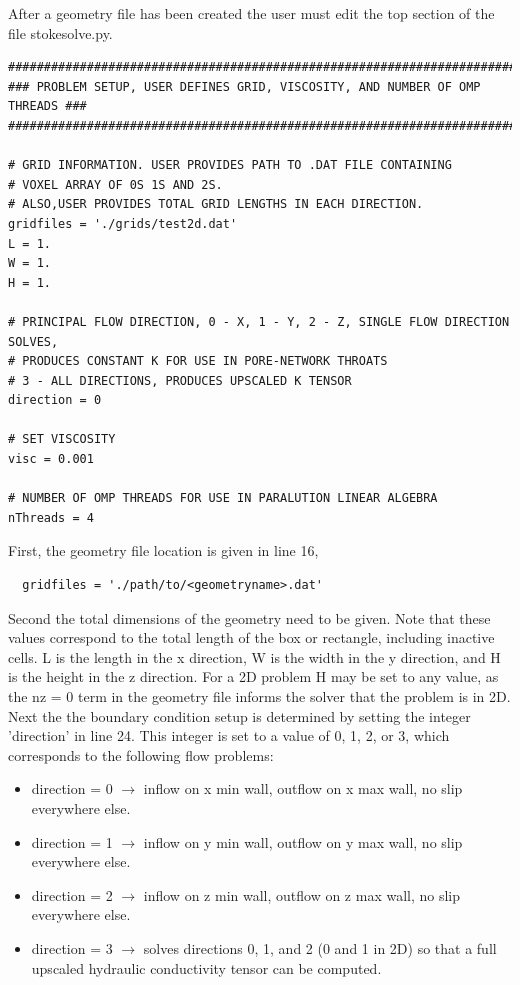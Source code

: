 \documentclass{report}
\begin{document}
After a geometry file has been created the user must
edit the top section of the file stokesolve.py.
\begin{lstlisting}
##############################################################################
### PROBLEM SETUP, USER DEFINES GRID, VISCOSITY, AND NUMBER OF OMP THREADS ###
##############################################################################

# GRID INFORMATION. USER PROVIDES PATH TO .DAT FILE CONTAINING
# VOXEL ARRAY OF 0S 1S AND 2S.
# ALSO,USER PROVIDES TOTAL GRID LENGTHS IN EACH DIRECTION.
gridfiles = './grids/test2d.dat'
L = 1.
W = 1.
H = 1.

# PRINCIPAL FLOW DIRECTION, 0 - X, 1 - Y, 2 - Z, SINGLE FLOW DIRECTION SOLVES,
# PRODUCES CONSTANT K FOR USE IN PORE-NETWORK THROATS
# 3 - ALL DIRECTIONS, PRODUCES UPSCALED K TENSOR
direction = 0

# SET VISCOSITY
visc = 0.001

# NUMBER OF OMP THREADS FOR USE IN PARALUTION LINEAR ALGEBRA
nThreads = 4

\end{lstlisting}

\noindent First, the geometry file location is given in line 16,
\begin{lstlisting}
  gridfiles = './path/to/<geometryname>.dat'
\end{lstlisting}

\noindent Second the total dimensions of the geometry need to be given. Note
that these values correspond to the total length of the box or rectangle, including
inactive cells. L is the length in the x direction, W is the width in the y
direction, and H is the height in the z direction. For a 2D problem H
may be set to any value, as the nz = 0 term in the geometry file informs
the solver that the problem is in 2D.\\

\noindent Next the the boundary condition setup is determined by setting
the integer 'direction' in line 24. This integer is set to a value
of 0, 1, 2, or 3, which corresponds to the following flow problems:
\begin{itemize}
  \item direction = 0 $\rightarrow$ inflow on x min wall, outflow on x max wall,
        no slip everywhere else.
  \item direction = 1 $\rightarrow$ inflow on y min wall, outflow on y max wall,
        no slip everywhere else.
  \item direction = 2 $\rightarrow$ inflow on z min wall, outflow on z max wall,
        no slip everywhere else.
  \item direction = 3 $\rightarrow$ solves directions 0, 1, and 2 (0 and 1 in 2D)
        so that a full upscaled hydraulic conductivity tensor can be computed.
\end{itemize}
\end{document}
